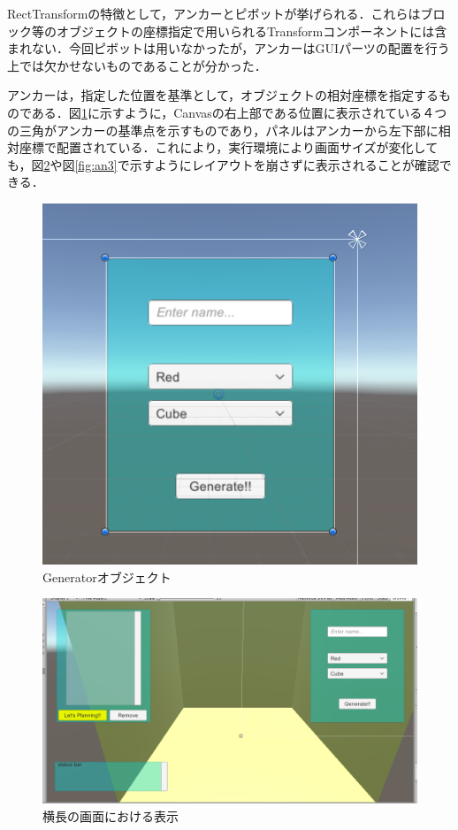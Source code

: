 \documentclass[12pt]{jarticle}
\begin{document}
RectTransformの特徴として，アンカーとピボットが挙げられる．これらはブロック等のオブジェクトの座標指定で用いられるTransformコンポーネントには含まれない．今回ピボットは用いなかったが，アンカーはGUIパーツの配置を行う上では欠かせないものであることが分かった．

アンカーは，指定した位置を基準として，オブジェクトの相対座標を指定するものである．図\ref{fig:an1}に示すように，Canvasの右上部である位置に表示されている４つの三角がアンカーの基準点を示すものであり，パネルはアンカーから左下部に相対座標で配置されている．これにより，実行環境により画面サイズが変化しても，図\ref{fig:an2}や図\ref{fig:an3}で示すようにレイアウトを崩さずに表示されることが確認できる．

\begin{figure}[!hbt]
  \begin{center}
    \includegraphics[scale=0.5]{images/BWP_Work6/anchor1.png}
  \end{center}
  \caption{Generatorオブジェクト}
  \label{fig:an1}
\end{figure}

\begin{figure}[!hbt]
  \begin{center}
    \includegraphics[scale=0.5]{images/BWP_Work6/anchor2.png}
  \end{center}
  \caption{横長の画面における表示}
  \label{fig:an2}
\end{figure}
\end{document}
